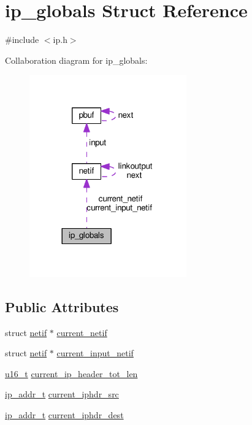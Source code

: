 \hypertarget{structip__globals}{}\section{ip\+\_\+globals Struct Reference}
\label{structip__globals}


{\ttfamily \#include $<$ip.\+h$>$}



Collaboration diagram for ip\+\_\+globals\+:
\nopagebreak
\begin{figure}[H]
\begin{center}
\leavevmode
\includegraphics[width=192pt]{structip__globals__coll__graph}
\end{center}
\end{figure}
\subsection*{Public Attributes}
\begin{DoxyCompactItemize}
\item 
struct \hyperlink{structnetif}{netif} $\ast$ \hyperlink{structip__globals_ac3ce50b618d04fe2c82e9525b10550ca}{current\+\_\+netif}
\item 
struct \hyperlink{structnetif}{netif} $\ast$ \hyperlink{structip__globals_a4099a6d61a3e05d25c573b978d82e4e0}{current\+\_\+input\+\_\+netif}
\item 
\hyperlink{group__compiler__abstraction_ga77570ac4fcab86864fa1916e55676da2}{u16\+\_\+t} \hyperlink{structip__globals_a17004526e6f1a164c0bab01aeac5e34a}{current\+\_\+ip\+\_\+header\+\_\+tot\+\_\+len}
\item 
\hyperlink{native_2lwip_2src_2include_2lwip_2ip__addr_8h_a88b43639738c4de2d3cd22e3a1fd7696}{ip\+\_\+addr\+\_\+t} \hyperlink{structip__globals_a04d85a3dc2c417050b3e088fa58a74b0}{current\+\_\+iphdr\+\_\+src}
\item 
\hyperlink{native_2lwip_2src_2include_2lwip_2ip__addr_8h_a88b43639738c4de2d3cd22e3a1fd7696}{ip\+\_\+addr\+\_\+t} \hyperlink{structip__globals_a0b4e54250c692c638408de54593d2aa1}{current\+\_\+iphdr\+\_\+dest}
\end{DoxyCompactItemize}


